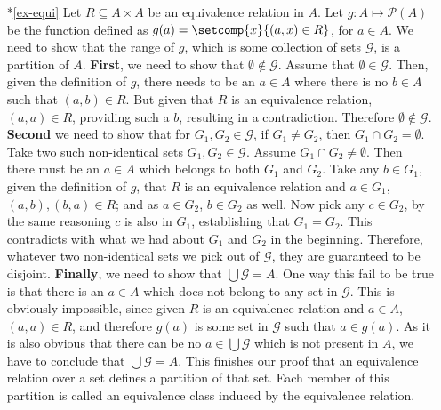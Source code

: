 \documentclass[11pt]{article}
\begin{document}
\begin{itemize}
\item[*\ref{ex-equi}] Let $R\subseteq A\times A$ be an equivalence relation in
$A$. Let $g: A \mapsto \mathcal{P}(A)$ be the function defined as $g(a) =
\setcomp{x}{(a,x) \in R}$, for $a\in A$. We need to show that the range of $g$,
which is some collection of sets $\mathcal{G}$, is a partition of $A$. {\bf
First}, we need to show that $\emptyset \not\in \mathcal{G}$. Assume that
$\emptyset \in \mathcal{G}$. Then, given the definition of $g$, there needs to
be an $a \in A$ where there is no $b \in A$ such that $(a,b) \in R$. But given
that $R$ is an equivalence relation, $(a,a) \in R$, providing such a $b$,
resulting in a contradiction. Therefore  $\emptyset \not\in \mathcal{G}$. {\bf
Second} we need to show that for $G_1, G_2 \in \mathcal{G}$, if $G_1 \neq G_2$,
then $G_1\cap G_2 = \emptyset$. Take two such non-identical sets $G_1, G_2 \in
\mathcal{G}$. Assume $G_1\cap G_2 \neq \emptyset$. Then there must be an $a \in
A$ which belongs to both $G_1$ and $G_2$. Take any $b \in G_1$, given the
definition of $g$,  that $R$ is an equivalence relation and $a\in G_1$, $(a,b),
(b,a) \in R$; and as $a \in G_2$, $b\in G_2$ as well. Now pick any $c\in G_2$,
by the same reasoning $c$ is also in $G_1$, establishing that $G_1 = G_2$. This
contradicts with what we had about $G_1$ and $G_2$ in the beginning. Therefore,
whatever two non-identical sets we pick out of $\mathcal{G}$, they are
guaranteed to be disjoint. {\bf Finally}, we need to show that $\bigcup
\mathcal{G} = A$. One way this fail to be true is that  there is an $a\in A$ which does
not belong to any set in $\mathcal{G}$. This is obviously impossible, since
given $R$ is an equivalence relation and $a\in A$, $(a,a) \in R$, and therefore
$g(a)$ is some set in $\mathcal{G}$ such that $a \in g(a)$. As it is also
obvious that there can be no $a \in \bigcup\mathcal{G}$ which is not present in
$A$, we have to conclude that $\bigcup
\mathcal{G} = A$. This finishes our proof that an equivalence relation over a
set defines a partition of that set. Each member of this partition is called an
equivalence class induced by the equivalence relation. 


\end{itemize}




\end{document}
